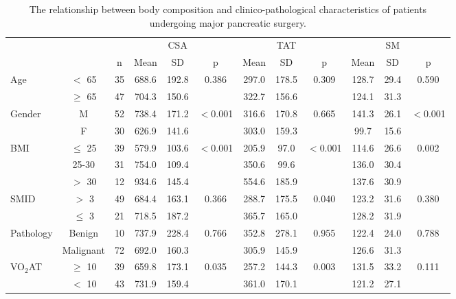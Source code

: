 \begin{sidewaystable}[p]
	\caption{The relationship between body composition and clinico-pathological characteristics of patients undergoing major pancreatic surgery.}
	\label{table:bc_clinical}
	\setlength{\tabcolsep}{9pt} %
	\centering
	\begin{tabular}{|l c c | c c c | c c c | c c c|}
		\hline
		           &           &    &       & CSA   &          &       & TAT   &          &       & SM   &  \\
		           &           & n  & Mean  & SD    & p        & Mean  & SD    & p        & Mean  & SD   & p        \\ \hline
		Age        & $<$ 65    & 35 & 688.6 & 192.8 & 0.386    & 297.0 & 178.5 & 0.309    & 128.7 & 29.4 & 0.590    \\
		           & $\geq$ 65 & 47 & 704.3 & 150.6 &          & 322.7 & 156.6 &          & 124.1 & 31.3 &  \\
		Gender     & M         & 52 & 738.4 & 171.2 & $<$0.001 & 316.6 & 170.8 & 0.665    & 141.3 & 26.1 & $<$0.001 \\
		           & F         & 30 & 626.9 & 141.6 &          & 303.0 & 159.3 &          & 99.7  & 15.6 &  \\
		BMI        & $\leq$ 25 & 39 & 579.9 & 103.6 & $<$0.001 & 205.9 & 97.0  & $<$0.001 & 114.6 & 26.6 & 0.002    \\
		           & 25-30     & 31 & 754.0 & 109.4 &          & 350.6 & 99.6  &          & 136.0 & 30.4 &  \\
		           & $>$ 30    & 12 & 934.6 & 145.4 &          & 554.6 & 185.9 &          & 137.6 & 30.9 &  \\
		SMID       & $>$ 3     & 49 & 684.4 & 163.1 & 0.366    & 288.7 & 175.5 & 0.040    & 123.2 & 31.6 & 0.380    \\
		           & $\leq$ 3  & 21 & 718.5 & 187.2 &          & 365.7 & 165.0 &          & 128.2 & 31.9 &  \\
		Pathology  & Benign    & 10 & 737.9 & 228.4 & 0.766    & 352.8 & 278.1 & 0.955    & 122.4 & 24.0 & 0.788    \\
		           & Malignant & 72 & 692.0 & 160.3 &          & 305.9 & 145.9 &          & 126.6 & 31.3 &  \\
		VO$_2$AT   & $\geq$ 10 & 39 & 659.8 & 173.1 & 0.035    & 257.2 & 144.3 & 0.003    & 131.5 & 33.2 & 0.111    \\
		           & $<$ 10    & 43 & 731.9 & 159.4 &          & 361.0 & 170.1 &          & 121.2 & 27.1 &  \\

\end{tabular}
\end{sidewaystable}

